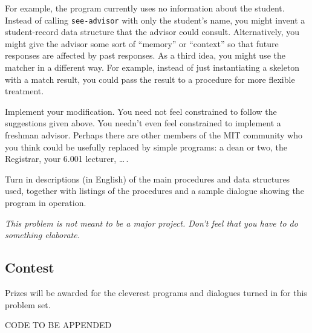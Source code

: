 For example, the program currently uses no information about the
student.  Instead of calling {\tt see-advisor} with only the student's
name, you might invent a student-record data structure that the
advisor could consult.  Alternatively, you might give the advisor some
sort of ``memory'' or ``context'' so that future responses are affected by
past responses.  As a third idea, you might use the matcher in a
different way.  For example, instead of just instantiating a skeleton
with a match result, you could pass the result to a procedure for more
flexible treatment.

Implement your modification.  You need not feel constrained to follow
the suggestions given above.  You needn't even feel constrained to
implement a freshman advisor.  Perhaps there are other members of the
MIT community who you think could be usefully replaced by simple
programs: a dean or two, the Registrar, your 6.001 lecturer, \ldots\,.

Turn in descriptions (in English) of the main procedures and data
structures used, together with listings of the procedures and a sample
dialogue showing the program in operation.

{\em This problem is not meant to be a major project.  Don't feel that you
have to do something elaborate.}

\subsection{Contest}

Prizes will be awarded for the cleverest programs and dialogues turned
in for this problem set.

\pagebreak

CODE TO BE APPENDED




